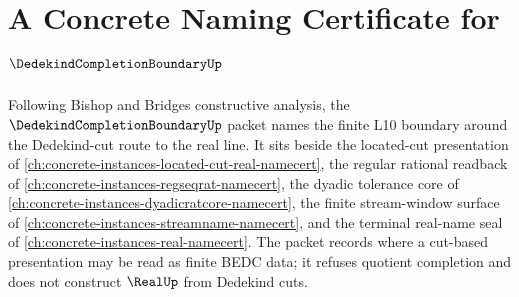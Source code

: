 \chapter{A Concrete Naming Certificate for $\DedekindCompletionBoundaryUp$}
\label{ch:concrete-instances-dedekind-completion-boundary-namecert}

Following Bishop and Bridges constructive analysis, the $\DedekindCompletionBoundaryUp$ packet names the finite L10 boundary around the Dedekind-cut route to the real line. It sits beside the located-cut presentation of \autoref{ch:concrete-instances-located-cut-real-namecert}, the regular rational readback of \autoref{ch:concrete-instances-regseqrat-namecert}, the dyadic tolerance core of \autoref{ch:concrete-instances-dyadicratcore-namecert}, the finite stream-window surface of \autoref{ch:concrete-instances-streamname-namecert}, and the terminal real-name seal of \autoref{ch:concrete-instances-real-namecert}. The packet records where a cut-based presentation may be read as finite BEDC data; it refuses quotient completion and does not construct $\RealUp$ from Dedekind cuts.

